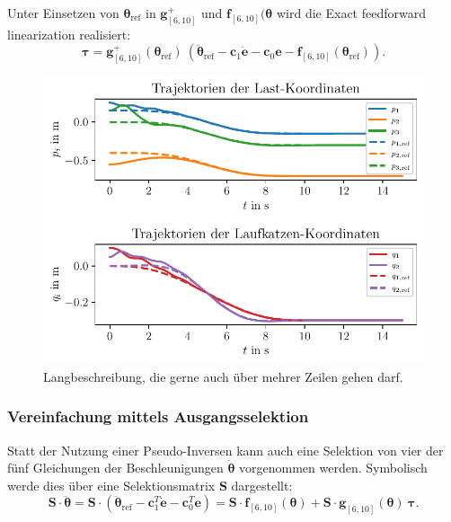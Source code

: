 Unter Einsetzen von $\boldsymbol{\theta}_{\text{ref}}$ in $\mathbf{g}_{[6, 10]}^+$ und $\mathbf{f}_{[6, 10]}(\boldsymbol{\theta}$ wird die Exact feedforward linearization realisiert:
\begin{equation}
\boldsymbol{\tau}= \mathbf{g}^{+}_{[6, 10]} (\boldsymbol{\theta}_{\text{ref}}) \ (\ddot{\boldsymbol{\theta}}_{\text{ref}} - \mathbf{c}_{1} \mathbf{\dot{e}} - \mathbf{c}_{0} \mathbf{e} - \mathbf{f}_{[6, 10]}(\boldsymbol{\theta}_{\text{ref}})).
\end{equation} 

\begin{figure}[ht]
	\begin{center}
		\includegraphics[scale=1]{Pictures/feedforward_lin_pseudo_controller_initial_error}
	\end{center}
	\caption[Kurzbeschreibung für Abbildungsverzeichnis]
	{Langbeschreibung, die gerne auch über mehrer Zeilen gehen darf.}
	\label{fig_feedforward_pseudo_controller_initial_error}
\end{figure}

\subsubsection{Vereinfachung mittels Ausgangsselektion}
Statt der Nutzung einer Pseudo-Inversen kann auch eine Selektion von vier der fünf Gleichungen der Beschleunigungen $\dot{\boldsymbol{\theta}}$ vorgenommen werden. Symbolisch werde dies über eine Selektionsmatrix $\mathbf{S}$ dargestellt:
\begin{equation}
	\mathbf{S} \cdot \ddot{\boldsymbol{\theta}} = \mathbf{S} \cdot (\ddot{\boldsymbol{\theta}}_{\text{ref}} - \mathbf{c}_1^T \dot{\mathbf{e}} - \mathbf{c}_0^T \mathbf{e}) = \mathbf{S} \cdot \mathbf{f}_{[6, 10]}(\boldsymbol{\theta}) + \mathbf{S} \cdot \mathbf{g}_{[6, 10]}(\boldsymbol{\theta}) \ \boldsymbol{\tau}.
\end{equation} 

